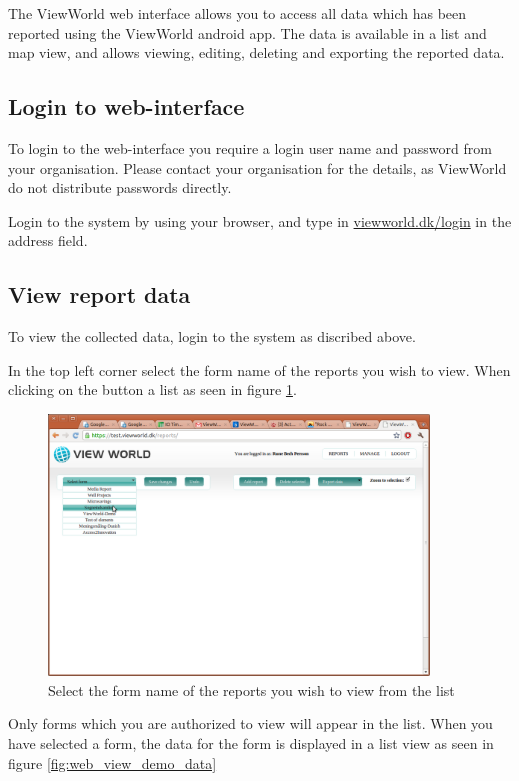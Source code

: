 \documentclass[a4paper, 12pt, final]{article}
\begin{document}
The ViewWorld web interface allows you to access all data which has been reported using the ViewWorld android app. The data is available in a list and map view, and allows viewing, editing, deleting and exporting the reported data. 

\subsection{Login to web-interface}

To login to the web-interface you require a login user name and password from your organisation. Please contact your organisation for the details, as ViewWorld do not distribute passwords directly.

Login to the system by using your browser, and type in \url{viewworld.dk/login} in the address field. 

\subsection{View report data}

To view the collected data, login to the system as discribed above.

In the top left corner select the form name of the reports you wish to view. When clicking on the button a list as seen in figure \ref{fig:web_select_report}.

\begin{figure}[H]
  \centering
      \includegraphics[width=0.9\textwidth]{pics/web_select_report.png}
  \caption{Select the form name of the reports you wish to view from the list}
  \label{fig:web_select_report}
\end{figure}

Only forms which you are authorized to view will appear in the list. When you have selected a form, the data for the form is displayed in a list view as seen in figure \ref{fig:web_view_demo_data}
\end{document}
